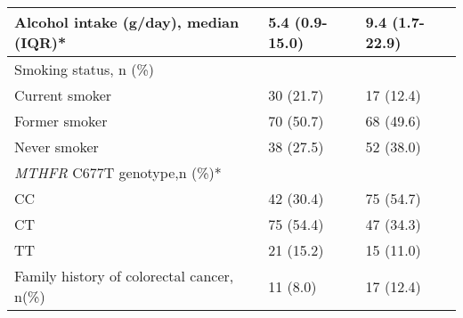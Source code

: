 \begin{center}
\begin{table}
\begin{adjustbox}{width=\textwidth}
\begin{tabular}{C{7.625cm}C{3.9950001cm}C{3.996cm}}
 Alcohol intake (g/day), median (IQR)*& 5.4 (0.9-15.0) & 9.4 (1.7-22.9)\\\hline 
 Smoking status, n (\%) &~ &~\\ Current smoker & 30 (21.7) & 17 (12.4)\\ Former smoker & 70 (50.7) & 68 (49.6)\\ Never smoker & 38 (27.5) & 52 (38.0)\\\hline 
 \textit{MTHFR} C677T genotype,n (\%)* &~ &~\\ CC & 42 (30.4) & 75 (54.7)\\ CT & 75 (54.4) & 47 (34.3)\\ TT & 21 (15.2) & 15 (11.0)\\\hline 
 Family history of colorectal cancer, n(\%) & 11 (8.0) & 17 (12.4)\\\hline 
\end{tabular}
\end{adjustbox}
\end{table}
\end{center}



